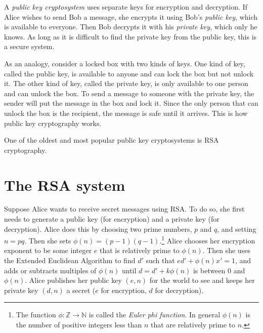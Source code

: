 \label{lab:RSA}


A \emph{public key cryptosystem} uses separate keys for encryption and decryption.
If Alice wishes to send Bob a message, she encrypts it using Bob's \emph{public key}, which is available to everyone.
Then Bob decrypts it with his \emph{private key}, which only he knows.
As long as it is difficult to find the private key from the public key, this is a secure system.


As an analogy, consider a locked box with two kinds of keys.
One kind of key, called the public key, is available to anyone and can lock the box but not unlock it.
The other kind of key, called the private key, is only available to one person and can unlock the box.
To send a message to someone with the private key, the sender will put the message in the box and lock it.
Since the only person that can unlock the box is the recipient, the message is safe until it arrives. This is how public key cryptography works.

One of the oldest and most popular public key cryptosystems is RSA cryptography.


\section*{The RSA system}
Suppose Alice wants to receive secret messages using RSA.
To do so, she first needs to generate a public key (for encryption) and a private key (for decryption).
Alice does this by choosing two prime numbers, $p$ and $q$, and setting $n=pq$.
Then she sets $\phi(n) = (p-1)(q-1)$.\footnote{
The function $\phi: \mathbb{Z} \rightarrow \mathbb{N}$ is called the \emph{Euler phi function}. In general $\phi(n)$ is the number of positive integers less than $n$ that are relatively prime to $n$.}
Alice chooses her encryption exponent to be some integer $e$ that is relatively prime to $\phi(n)$.
Then she uses the Extended Euclidean Algorithm to find $d'$ such that $ed' + \phi(n)x' = 1$, and adds or subtracts multiples of $\phi(n)$ until $d = d'+k\phi(n)$ is between 0 and $\phi(n)$.
Alice publishes her public key $(e, n)$ for the world to see and keeps her private key $(d,n)$ a secret ($e$ for encryption, $d$ for decryption).

